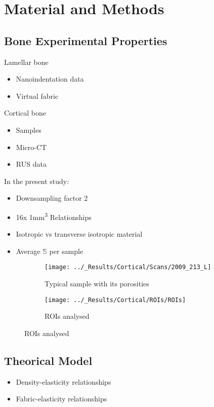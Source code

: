 \documentclass[a4paper,fleqn]{DC_ArtStyle}
\begin{document}
	
	\newpage
	\section{Material and Methods}

	\subsection{Bone Experimental Properties}
	Lamellar bone
	\begin{itemize}
		\item Nanoindentation data
		\item Virtual fabric
	\end{itemize}

	Cortical bone
	\begin{itemize}
		\item Samples
		\item Micro-CT
		\item RUS data
	\end{itemize}

	In the present study:
	\begin{itemize}
		\item Downsampling factor 2
		\item 16x 1mm\textsuperscript{3} Relationships
		\item Isotropic vs transverse isotropic material
		\item Average $\mathbb{S}$ per sample
	\end{itemize}

	\begin{figure}[!h]
		\centering
		\begin{subfigure}[t]{.45\linewidth}
			\texttt{[image: ../\_Results/Cortical/Scans/2009\_213\_L]}
			\caption{Typical sample with its porosities}
		\end{subfigure}
		\begin{subfigure}[t]{0.45\linewidth}
			\texttt{[image: ../\_Results/Cortical/ROIs/ROIs]}
			\caption{ROIs analysed}
		\end{subfigure}
	\end{figure}

	\subsection{Theorical Model}
	\begin{itemize}
		\item Density-elasticity relationships
		\item Fabric-elasticity relationships
	\end{itemize}
\end{document}
